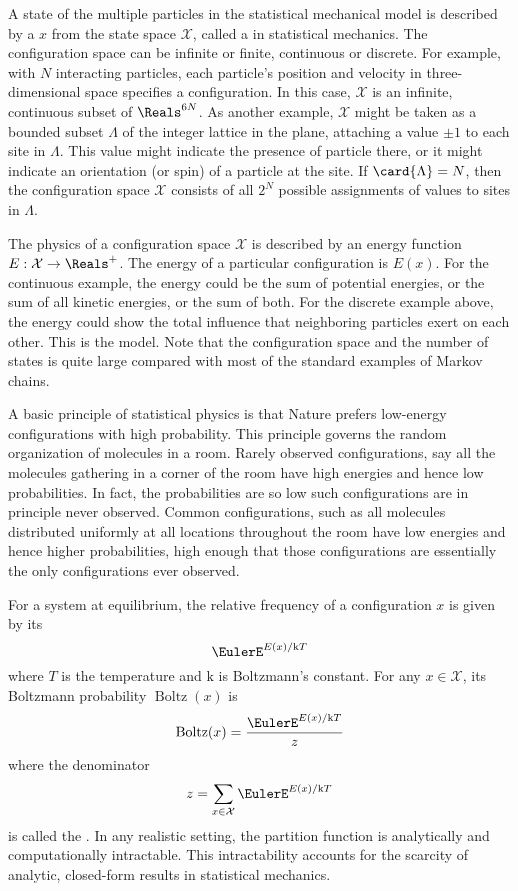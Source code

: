 \documentclass[12pt]{article}
\begin{document}
A state of the multiple particles in the statistical mechanical model is
described by a  \( x \) from the state space \(
\mathcal{X} \), called a  in statistical
mechanics.%
The configuration space can be infinite or finite, continuous or
discrete.  For example, with \( N \) interacting particles, each
particle's position and velocity in three-dimensional space specifies a
configuration.  In this case, \( \mathcal{X} \) is an infinite,
continuous subset of \( \Reals^{6N} \).  As another example, \( \mathcal
{X} \) might be taken as a bounded subset \( \Lambda \) of the integer
lattice in the plane, attaching a value \( \pm 1 \) to each site in \(
\Lambda \).  This value might indicate the presence of particle there,
or it might indicate an orientation (or spin) of a particle at the site.
If \( \card{\Lambda} = N \), then the configuration space \( \mathcal{X}
\) consists of all \( 2^N \) possible assignments of values to sites in \(
\Lambda \).

The physics of a configuration space \( \mathcal{X} \) is described by
an energy function \( E:  \mathcal{X} \to \Reals^+ \).  The energy of a
particular configuration is \( E(x) \).  For the continuous example, the
energy could be the sum of potential energies, or the sum of all kinetic
energies, or the sum of both.  For the discrete example above, the
energy could show the total influence that neighboring particles exert
on each other.  This is the  model.%
Note that the configuration space and the number of states is quite
large compared with most of the standard examples of Markov chains.

A basic principle of statistical physics is that Nature prefers
low-energy configurations with high probability.  This principle governs
the random organization of molecules in a room.  Rarely observed
configurations, say all the molecules gathering in a corner of the room
have high energies and hence low probabilities.  In fact, the
probabilities are so low such configurations are in principle never
observed.  Common configurations, such as all molecules distributed
uniformly at all locations throughout the room have low energies and
hence higher probabilities, high enough that those configurations are
essentially the only configurations ever observed.

For a system at equilibrium, the relative frequency of a configuration \(
x \) is given by its %
\[
    \EulerE^{E(x)/\mathrm{k}T}
\] where \( T \) is the temperature and \( \mathrm{k} \) is Boltzmann's
constant. For any \( x \in \mathcal{X} \), its Boltzmann probability \(
\operatorname{Boltz}
(x) \) is
\[
    \operatorname{Boltz}
    (x) = \frac{\EulerE^{E(x)/\mathrm{k}T}}{z}
\] where the denominator
\[
    z = \sum\limits_{x \in \mathcal{X}} \EulerE^{E(x)/\mathrm{k}T}
\] is called the .%
In any realistic setting, the partition function is analytically and
computationally intractable.  This intractability accounts for the
scarcity of analytic, closed-form results in statistical mechanics.
\end{document}
